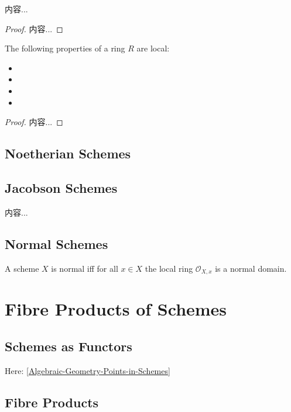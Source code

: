 \documentclass[Total.tex]{subfiles}
\begin{document}
						\begin{lemma}
							内容...
						\end{lemma}
						\begin{proof}
							内容...
						\end{proof}
						
						\begin{lemma}
							The following properties of a ring $R$ are local:
							\begin{itemize}
								\item 
								\item 
								\item 
								\item 
							\end{itemize}
						\end{lemma}
						\begin{proof}
							内容...
						\end{proof}
				\subsection{Noetherian Schemes}
				
				\subsection{Jacobson Schemes}
					\begin{Def}
						内容...
					\end{Def}
				
				\subsection{Normal Schemes}
					\begin{Def}
						A scheme $X$ is normal iff for all $x\in X$ the local ring $\mathcal{O}_{X,x}$ is a normal domain.
					\end{Def}
				
			
					
			\section{Fibre Products of Schemes}
				\subsection{Schemes as Functors}
					Here: \ref{Algebraic-Geometry-Points-in-Schemes}
				\subsection{Fibre Products}
			
\end{document}

